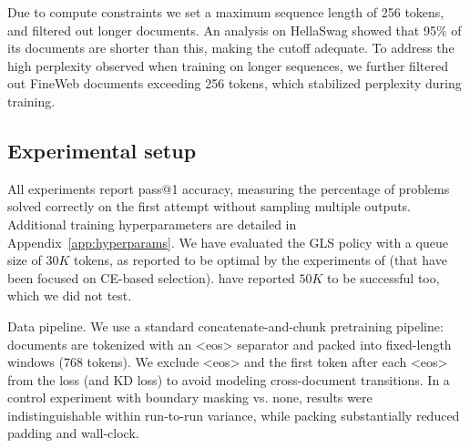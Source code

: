 \documentclass[11pt]{article}
\begin{document}
Due to compute constraints we set a maximum sequence length of 256 tokens, and filtered out longer documents.
An analysis on HellaSwag showed that 95\% of its documents are shorter than this, making the cutoff adequate.
To address the high perplexity observed when training on longer sequences, we further filtered out FineWeb documents exceeding 256 tokens, which stabilized perplexity during training.

\subsection{Experimental setup}

All experiments report pass@1 accuracy, measuring the percentage of problems solved correctly on the first attempt without sampling multiple outputs.
Additional training hyperparameters are detailed in Appendix~\ref{app:hyperparams}.
We have evaluated the GLS policy with a queue size of $30K$ tokens, as reported to be optimal by the experiments of \citet{wang2021selectivekd} (that have been focused on CE-based selection).
\citep{wang2021selectivekd} have reported $50K$ to be successful too, which we did not test.

Data pipeline. We use a standard concatenate-and-chunk pretraining pipeline: documents are tokenized with an <eos> separator and packed into fixed-length windows (768 tokens).
We exclude <eos> and the first token after each <eos> from the loss (and KD loss) to avoid modeling cross-document transitions.
In a control experiment with boundary masking vs. none, results were indistinguishable within run-to-run variance, while packing substantially reduced padding and wall-clock.
\end{document}
